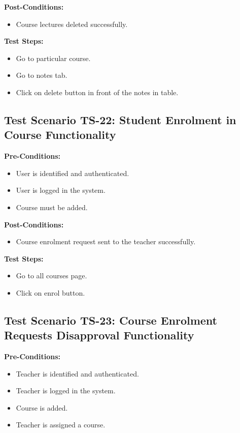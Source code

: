 \textbf{Post-Conditions: }
\begin{itemize}

\item Course lectures deleted successfully.

\end{itemize}
\textbf{Test Steps:}
\begin{itemize}

\item Go to particular course.
\item Go to notes tab.
\item Click on delete button in front of the notes in table.

\end{itemize}




\subsection{Test Scenario TS-22: Student Enrolment in Course Functionality}
\textbf{Pre-Conditions: }
\begin{itemize}

\item User is identified and authenticated.
\item User is logged in the system.
\item Course must be added.

\end{itemize}

\textbf{Post-Conditions: }
\begin{itemize}
\item Course enrolment request sent to the teacher successfully.

\end{itemize}
\textbf{Test Steps:}
\begin{itemize}

\item Go to all courses page.
\item Click on enrol button.

\end{itemize}



\subsection{Test Scenario TS-23: Course Enrolment Requests Disapproval Functionality}
\textbf{Pre-Conditions: }
\begin{itemize}

\item Teacher is identified and authenticated.
\item Teacher is logged in the system.
\item Course is added.
\item Teacher is assigned a course.

\end{itemize}

